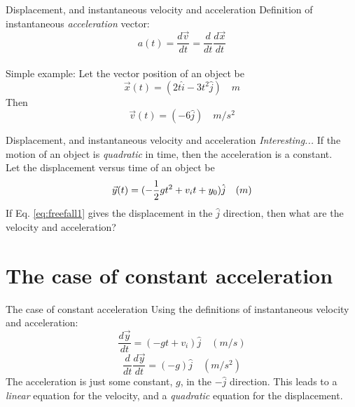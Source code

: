 \documentclass{beamer}
\begin{document}
\begin{frame}{Displacement, and instantaneous velocity and acceleration}
Definition of instantaneous \textit{acceleration} vector:
\begin{equation}
\boxed{a(t) = \frac{d\vec{v}}{dt} = \frac{d}{dt} \frac{d\vec{x}}{dt}}
\end{equation} \\
\vspace{0.5cm}
Simple example: Let the vector position of an object be
\begin{equation}
\vec{x}(t) = (2t \hat{i} - 3t^2\hat{j}) \quad m
\end{equation}
Then
\begin{equation}
\vec{v}(t) = (-6\hat{j}) \quad m/s^2
\end{equation}
\end{frame}

\begin{frame}{Displacement, and instantaneous velocity and acceleration}
\textit{Interesting...} If the motion of an object is \textit{quadratic} in time, then the acceleration is a constant. \\
\vspace{0.2cm}
Let the displacement versus time of an object be \\
\begin{equation}
\vec{y}(t) = (-\frac{1}{2}gt^2 + v_{i}t + y_{\rm 0}) \hat{j} \quad (m)
\label{eq:freefall1}
\end{equation}
If Eq. \ref{eq:freefall1} gives the displacement in the $\hat{j}$ direction, then what are the velocity and acceleration?
\end{frame}

\section{The case of constant acceleration}

\begin{frame}{The case of constant acceleration}
Using the definitions of instantaneous velocity and acceleration: \\
\begin{equation}
\frac{d\vec{y}}{dt} = (-gt + v_{i}) \hat{j} \quad (m/s)
\label{eq:freefall2}
\end{equation}
\begin{equation}
\frac{d}{dt}\frac{d\vec{y}}{dt} = (-g) \hat{j} \quad (m/s^2)
\label{eq:freefall3}
\end{equation}
The acceleration is just some constant, $g$, in the $-\hat{j}$ direction.  This leads to a \textit{linear} equation for the velocity, and a \textit{quadratic} equation for the displacement.
\end{frame}
\end{document}
